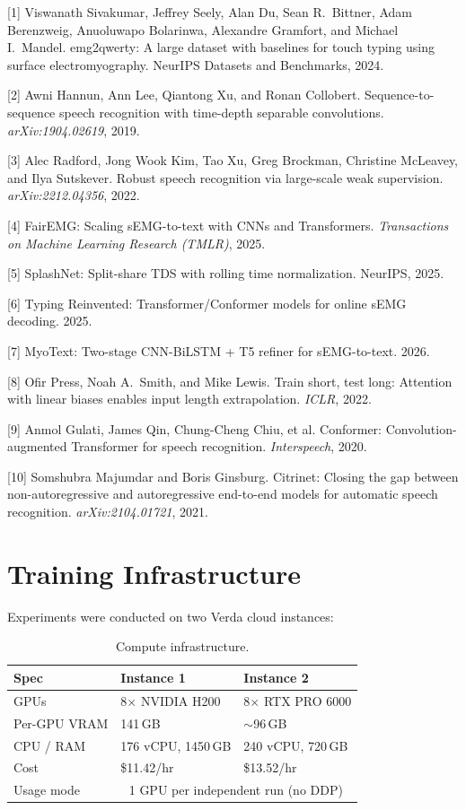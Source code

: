 \documentclass{article}
\begin{document}
{
\small

[1] Viswanath Sivakumar, Jeffrey Seely, Alan Du, Sean R.\ Bittner, Adam Berenzweig, Anuoluwapo Bolarinwa, Alexandre Gramfort, and Michael I.\ Mandel. emg2qwerty: A large dataset with baselines for touch typing using surface electromyography. NeurIPS Datasets and Benchmarks, 2024.

[2] Awni Hannun, Ann Lee, Qiantong Xu, and Ronan Collobert. Sequence-to-sequence speech recognition with time-depth separable convolutions. \textit{arXiv:1904.02619}, 2019.

[3] Alec Radford, Jong Wook Kim, Tao Xu, Greg Brockman, Christine McLeavey, and Ilya Sutskever. Robust speech recognition via large-scale weak supervision. \textit{arXiv:2212.04356}, 2022.

[4] FairEMG: Scaling sEMG-to-text with CNNs and Transformers. \textit{Transactions on Machine Learning Research (TMLR)}, 2025.

[5] SplashNet: Split-share TDS with rolling time normalization. NeurIPS, 2025.

[6] Typing Reinvented: Transformer/Conformer models for online sEMG decoding. 2025.

[7] MyoText: Two-stage CNN-BiLSTM + T5 refiner for sEMG-to-text. 2026.

[8] Ofir Press, Noah A.\ Smith, and Mike Lewis. Train short, test long: Attention with linear biases enables input length extrapolation. \textit{ICLR}, 2022.

[9] Anmol Gulati, James Qin, Chung-Cheng Chiu, et al. Conformer: Convolution-augmented Transformer for speech recognition. \textit{Interspeech}, 2020.

[10] Somshubra Majumdar and Boris Ginsburg. Citrinet: Closing the gap between non-autoregressive and autoregressive end-to-end models for automatic speech recognition. \textit{arXiv:2104.01721}, 2021.

}


\newpage

\appendix
\section{Training Infrastructure}

Experiments were conducted on two Verda cloud instances:

\begin{table}[h]
\centering
\small
\begin{tabular}{lll}
\toprule
\textbf{Spec} & \textbf{Instance 1} & \textbf{Instance 2} \\
\midrule
GPUs & 8$\times$ NVIDIA H200 & 8$\times$ RTX PRO 6000 \\
Per-GPU VRAM & 141\,GB & ${\sim}$96\,GB \\
CPU / RAM & 176 vCPU, 1450\,GB & 240 vCPU, 720\,GB \\
Cost & \$11.42/hr & \$13.52/hr \\
Usage mode & \multicolumn{2}{c}{1 GPU per independent run (no DDP)} \\
\bottomrule
\end{tabular}
\caption{Compute infrastructure.}
\end{table}
\end{document}
